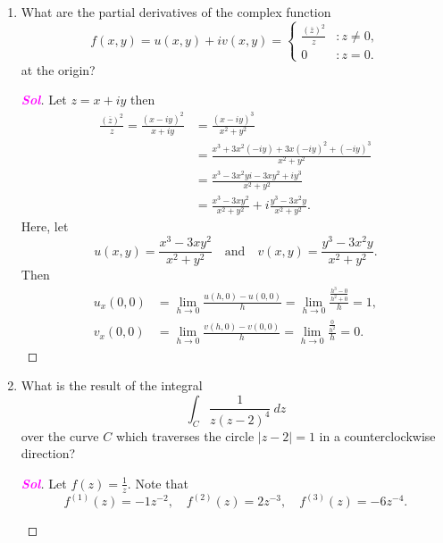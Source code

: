\documentclass{article}
\theoremstyle{definition}
\newcommand{\of}[1]{\left( #1 \right)}
\newcommand{\abs}[1]{\left\lvert #1 \right\rvert}
\newcommand{\sol}{\textcolor{magenta}{\bf Sol}}
\newcommand{\conjugate}[1]{\overline{#1}}
\newcommand{\res}{\textnormal{res}}
\renewcommand{\Re}{\operatorname{Re}}
\renewcommand{\Im}{\operatorname{Im}}
\begin{document}
\begin{enumerate}[\bf 1.]
\begin{proof}[\sol]
\begin{center}
			\end{center} By residue theorem, we have\[
			\oint_C\frac{1}{(z-1)^2}\ dz=2\pi i\cdot\res(f,1)=0.
			\]
		\end{proof}
		\vspace{8pt}
		\item What are the partial derivatives of the complex function \[
		f(x,y)=u(x,y)+iv(x,y)=\begin{cases}
		\frac{\of{\conjugate{z}}^2}{z} &:z\neq0,\\
		0 &:z=0.
		\end{cases}
		\] at the origin?
		\begin{proof}[\sol]
			Let $z=x+iy$ then \begin{align*}
			\frac{\of{\conjugate{z}}^2}{z}=\frac{(x-iy)^2}{x+iy}&=\frac{(x-iy)^3}{x^2+y^2}\\
			&=\frac{x^3+3x^2(-iy)+3x(-iy)^2+(-iy)^3}{x^2+y^2}\\
			&=\frac{x^3-3x^2yi-3xy^2+iy^3}{x^2+y^2}\\
			&=\frac{x^3-3xy^2}{x^2+y^2}+i\frac{y^3-3x^2y}{x^2+y^2}.
			\end{align*} Here, let \[
			u(x,y)=\frac{x^3-3xy^2}{x^2+y^2}\quad\text{and}\quad v(x,y)=\frac{y^3-3x^2y}{x^2+y^2}.
			\] Then \begin{align*}
			u_x(0,0)&=\lim\limits_{h\to 0}\frac{u(h,0)-u(0,0)}{h}=\lim\limits_{h\to 0}\frac{\frac{h^3-0}{h^2+0}}{h}=1,\\
			v_x(0,0)&=\lim\limits_{h\to 0}\frac{v(h,0)-v(0,0)}{h}=\lim\limits_{h\to 0}\frac{\frac{0}{h^2}}{h}=0.
			\end{align*}
		\end{proof}
		\vspace{8pt}
		\item What is the result of the integral \[
		\int_C \frac{1}{z(z-2)^4}\ dz
		\] over the curve $C$ which traverses the circle $\abs{z-2} = 1$ in a counterclockwise direction?
		\begin{proof}[\sol]
			Let $f(z)=\frac{1}{z}$. Note that \[
			f^{(1)}(z)=-1z^{-2},\quad f^{(2)}(z)=2z^{-3},\quad f^{(3)}(z)=-6z^{-4}.
			\] \begin{center}
\end{center}
\end{proof}
\end{enumerate}
\end{document}
